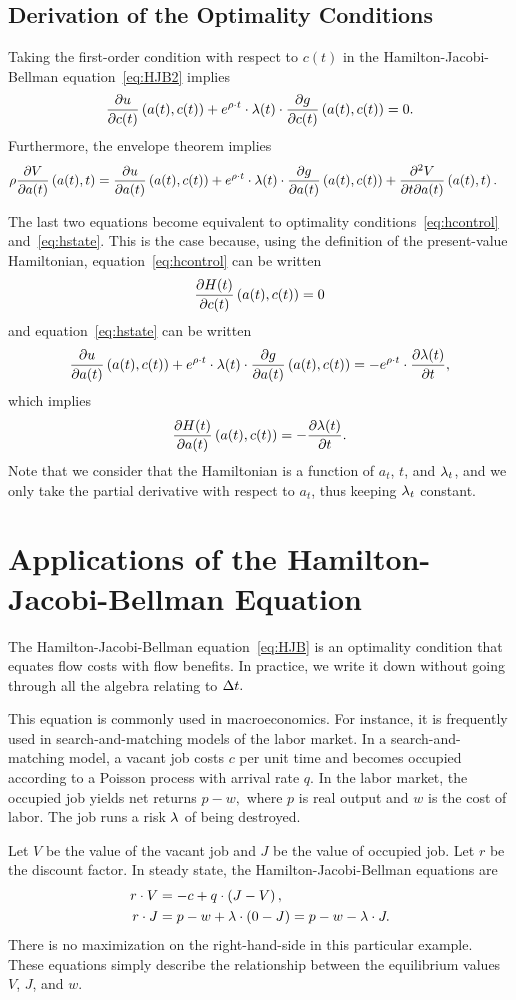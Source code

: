\documentclass[letterpaper,12pt,leqno]{article}
\begin{document}
\subsection{Derivation of the Optimality Conditions}

Taking the first-order condition with respect to $c(t)$ in the Hamilton-Jacobi-Bellman equation~\eqref{eq:HJB2} implies
\begin{equation*}
\frac{\partial u}{\partial c(t)}\left( a(t),c(t) \right)+e^{\rho \cdot t}\cdot\lambda (t) \cdot \frac{\partial g}{\partial c(t)}\left( a(t),c(t) \right)=0.
\end{equation*}
Furthermore, the envelope theorem implies
\begin{align*}
\rho \frac{\partial V}{\partial a(t)}\left( a(t),t \right)&=\frac{\partial u}{\partial a(t)}\left( a(t),c(t) \right)+e^{\rho \cdot t}\cdot\lambda (t)\cdot \frac{\partial g}{\partial a(t)}\left(  a(t),c(t) \right)+\frac{\partial^{2}V}{\partial t\partial a(t)}\left( a(t),t \right).
\end{align*}

The last two equations become equivalent to optimality conditions~\eqref{eq:hcontrol} and~\eqref{eq:hstate}. This is the case because, using the definition of the present-value Hamiltonian, equation~\eqref{eq:hcontrol} can be written
\[\frac{\partial H(t)}{\partial c(t)}\left( a(t),c(t) \right) =0\]
and equation~\eqref{eq:hstate} can be written
\[\frac{\partial u}{\partial a(t)}\left( a(t),c(t) \right) +e^{\rho\cdot  t}\cdot \lambda(t)\cdot \frac{\partial g}{\partial a(t)}\left( a(t),c(t) \right)=-e^{\rho\cdot  t}\cdot \frac{\partial \lambda(t)}{\partial t},\]
which implies
\[\frac{\partial H(t)}{\partial a(t)}\left( a(t),c(t) \right) =-\frac{\partial \lambda(t)}{\partial t}.\]
Note that we consider that the Hamiltonian is a function of $a_{t}$, $t$, and $\lambda_{t}$, and we only take the partial derivative with respect to $a_{t}$, thus keeping $\lambda_{t}$ constant.

\section{Applications of the Hamilton-Jacobi-Bellman Equation}

The Hamilton-Jacobi-Bellman equation~\eqref{eq:HJB} is an optimality condition that equates flow costs with flow benefits. In practice, we write it down without going through all the algebra relating to $\Delta t.$ 

This equation is commonly used in macroeconomics. For instance, it is frequently used in search-and-matching models of the labor market. In a search-and-matching model, a vacant job costs $c$ per unit time and becomes occupied according to a Poisson process with arrival rate $q.$ In the labor market, the occupied job yields net returns $p-w,$ where $p$ is real output and $w$ is the cost of labor. The job runs a risk $\lambda$ of being destroyed. 

Let $V$ be the value of the vacant job and $J$ be the value of occupied job. Let $r$ be the discount factor. In steady state, the Hamilton-Jacobi-Bellman equations are
\begin{align*}
r\cdot V &=-c+q \cdot  \left( J-V \right),\\
r\cdot J &=p-w+ \lambda \cdot \left( 0-J \right)=p-w-\lambda \cdot J.
\end{align*}
There is no maximization on the right-hand-side in this particular example. These equations simply describe the relationship between the equilibrium values $V$, $J$, and $w$. 
\end{document}
